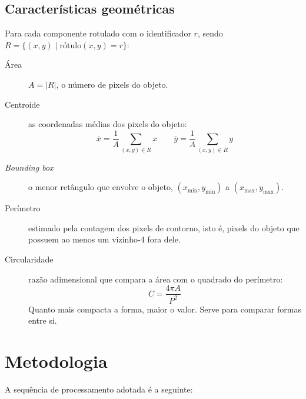 \documentclass[12pt,a4paper]{article}
\begin{document}
\subsection{Características geométricas}

Para cada componente rotulado com o identificador $r$, sendo
$R = \{(x,y) \mid \text{rótulo}(x,y) = r\}$:

\begin{description}
  \item[Área] $A = |R|$, o número de pixels do objeto.

  \item[Centroide] as coordenadas médias dos pixels do objeto:
    \begin{equation}
      \bar{x} = \frac{1}{A}\sum_{(x,y) \in R} x
      \qquad
      \bar{y} = \frac{1}{A}\sum_{(x,y) \in R} y
    \end{equation}

  \item[\emph{Bounding box}] o menor retângulo que envolve o objeto,
    $(x_{\min}, y_{\min})$ a $(x_{\max}, y_{\max})$.

  \item[Perímetro] estimado pela contagem dos pixels de contorno, isto é,
    pixels do objeto que possuem ao menos um vizinho-4 fora dele.

  \item[Circularidade] razão adimensional que compara a área com o quadrado do
    perímetro:
    \begin{equation}
      C = \frac{4\pi A}{P^2}
      \label{eq:circ}
    \end{equation}
    Quanto mais compacta a forma, maior o valor. Serve para comparar formas
    entre si.
\end{description}

\section{Metodologia}

A sequência de processamento adotada é a seguinte:

\begin{center}
\end{center}
\end{document}
